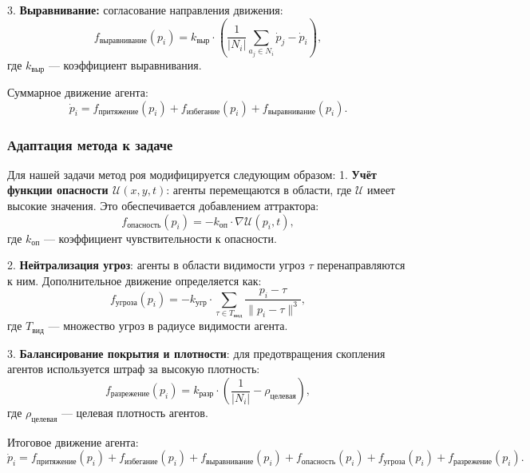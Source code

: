 3. \textbf{Выравнивание:} согласование направления движения:  
\begin{equation}
	f_{\text{выравнивание}}(p_i) = k_{\text{выр}} \cdot \left( \frac{1}{|N_i|} \sum_{a_j \in N_i} \dot{p}_j - \dot{p}_i \right),
\end{equation}
где $k_{\text{выр}}$ — коэффициент выравнивания.

Суммарное движение агента:
\begin{equation}
	\dot{p}_i = f_{\text{притяжение}}(p_i) + f_{\text{избегание}}(p_i) + f_{\text{выравнивание}}(p_i).
\end{equation}

\subsubsection*{Адаптация метода к задаче}
Для нашей задачи метод роя модифицируется следующим образом:  
1. \textbf{Учёт функции опасности $\mathcal{U}(x, y, t)$}: агенты перемещаются в области, где $\mathcal{U}$ имеет высокие значения.
Это обеспечивается добавлением аттрактора:
\begin{equation}
	f_{\text{опасность}}(p_i) = -k_{\text{оп}} \cdot \nabla \mathcal{U}(p_i, t),
\end{equation}
где $k_{\text{оп}}$ — коэффициент чувствительности к опасности.

2. \textbf{Нейтрализация угроз}: агенты в области видимости угроз $\tau$ перенаправляются к ним.
Дополнительное движение определяется как:
\begin{equation}
	f_{\text{угроза}}(p_i) = -k_{\text{угр}} \cdot \sum_{\tau \in T_{\text{вид}}} \frac{p_i - \tau}{\|p_i - \tau\|^3},
\end{equation}
где $T_{\text{вид}}$ — множество угроз в радиусе видимости агента.

3. \textbf{Балансирование покрытия и плотности}: для предотвращения скопления агентов используется штраф за высокую плотность:
\begin{equation}
	f_{\text{разрежение}}(p_i) = k_{\text{разр}} \cdot \left( \frac{1}{|N_i|} - \rho_{\text{целевая}} \right),
\end{equation}
где $\rho_{\text{целевая}}$ — целевая плотность агентов.

Итоговое движение агента:
\begin{equation}
	\dot{p}_i = f_{\text{притяжение}}(p_i) + f_{\text{избегание}}(p_i) + f_{\text{выравнивание}}(p_i) + f_{\text{опасность}}(p_i) + f_{\text{угроза}}(p_i) + f_{\text{разрежение}}(p_i).
\end{equation}

